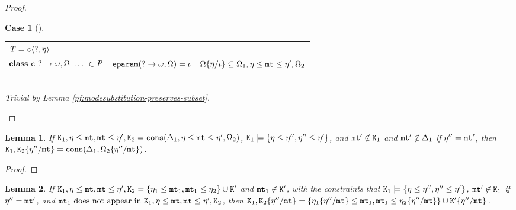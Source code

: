 \documentclass[onecolumn,nocopyrightspace]{sigplanconf}
\newtheorem{lemma}{Lemma}
\theoremstyle{lessintrusive}
\theoremstyle{plain}
\theoremstyle{custom}
\newtheorem*{case}{Case}
\theoremstyle{subcase-custom}
\def\econsexp#1#2#3{#1\msub#2\msub#3}
\begin{document}
\begin{proof}
\begin{case}[] 
\begin{tabular}[t]{>{$}l<{$} >{$}l<{$} >{$}l<{$}}
\bt = \Cname\lb\dynmode,\overline{\basemode}\rb & & \\
\kwclass\ \Cname\ \dynmode\rightarrow\econs,\espec\ \dots\ \in \programcode & \Feparam(\dynmode\rightarrow\econs,\espec) = \listi & \espec\subst{\listi}{\overline{\basemode}} \subseteq \espec_{1},\econsexp{\basemode}{\mtvar}{\basemode'},\espec_{2} \\
\end{tabular}\\
Trivial by Lemma \ref{pf:modesubstitution-preserves-subset}.
\end{case} 

\end{proof}

\begin{lemma}
\label{pf:modesubstitution-preserves-cons}
If $\mathtt{K}_{1},\eta\leq\mathtt{mt},\mathtt{mt}\leq\eta',\mathtt{K}_{2} = \mathtt{cons}(\Delta_{1},\eta\leq\mathtt{mt}\leq\eta',\Omega_{2})$, $\mathtt{K}_{1}\models\{\eta\leq\eta'',\eta''\leq\eta'\}$, and $\mathtt{mt}' \not\in \mathtt{K}_{1}$ and $\mathtt{mt}' \not\in \Delta_{1}$ if $\eta'' = \mathtt{mt}'$, then $\mathtt{K}_{1},\mathtt{K}_{2}\{\eta''/\mathtt{mt}\} = \mathtt{cons}(\Delta_{1},\Omega_{2}\{\eta''/\mathtt{mt}\})$.
\end{lemma}

\begin{proof}
\end{proof}

\begin{lemma}
\label{pf:modesubstitution-preserves-existential-constraint-equals}
If $\mathtt{K}_{1},\eta\leq\mathtt{mt},\mathtt{mt}\leq\eta',\mathtt{K}_{2} = \{\eta_{1}\leq\mathtt{mt}_{1},\mathtt{mt}_{1}\leq\eta_{2}\}\cup\mathtt{K}'$ and $\mathtt{mt}_{1} \not\in \mathtt{K}'$, with the constraints that $\mathtt{K}_{1}\models\{\eta\leq\eta'',\eta''\leq\eta'\}$, $\mathtt{mt}' \not\in \mathtt{K}_{1}$ if $\eta'' = \mathtt{mt}'$, and $\mtvar_{1}\ \textrm{does not appear in}\ \cset_{1},\basemode\msub\mtvar,\mtvar\msub\basemode',\cset_{2}$, then $\mathtt{K}_{1},\mathtt{K}_{2}\{\eta''/\mathtt{mt}\} = \{\eta_{1}\{\eta''/\mathtt{mt}\}\leq\mathtt{mt}_{1},\mathtt{mt}_{1}\leq\eta_{2}\{\eta''/\mathtt{mt}\}\}\cup\mathtt{K}'\{\eta''/\mathtt{mt}\}$.
\end{lemma}
\end{document}
